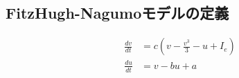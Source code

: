 \subsection{FitzHugh-Nagumoモデルの定義}$$
\begin{align*} \frac{dv}{dt} &= c\left(v-\frac{v^3}{3}-u+I_e\right)\\ 
\frac{du}{dt} &= v-bu+a \end{align*}
$$